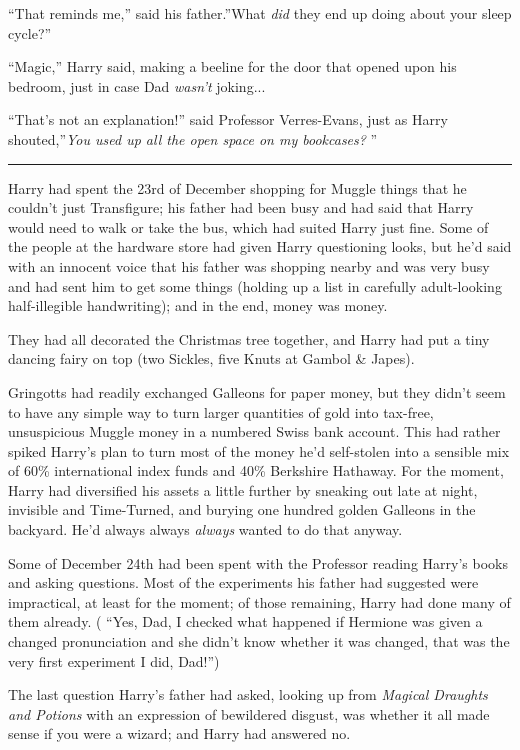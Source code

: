 ``That reminds me,'' said his father.''What \emph{did} they end up doing
about your sleep cycle?''

``Magic,'' Harry said, making a beeline for the door that opened upon
his bedroom, just in case Dad \emph{wasn't} joking...

``That's not an explanation!'' said Professor Verres-Evans, just as
Harry shouted,''\emph{You used up all the open space on my bookcases?} ''

\begin{center}\rule{3in}{0.4pt}\end{center}

Harry had spent the 23rd of December shopping for Muggle things that he
couldn't just Transfigure; his father had been busy and had said that
Harry would need to walk or take the bus, which had suited Harry just
fine. Some of the people at the hardware store had given Harry
questioning looks, but he'd said with an innocent voice that his father
was shopping nearby and was very busy and had sent him to get some
things (holding up a list in carefully adult-looking half-illegible
handwriting); and in the end, money was money.

They had all decorated the Christmas tree together, and Harry had put a
tiny dancing fairy on top (two Sickles, five Knuts at Gambol \& Japes).

Gringotts had readily exchanged Galleons for paper money, but they
didn't seem to have any simple way to turn larger quantities of gold
into tax-free, unsuspicious Muggle money in a numbered Swiss bank
account. This had rather spiked Harry's plan to turn most of the money
he'd self-stolen into a sensible mix of 60\% international index funds
and 40\% Berkshire Hathaway. For the moment, Harry had diversified his
assets a little further by sneaking out late at night, invisible and
Time-Turned, and burying one hundred golden Galleons in the backyard.
He'd always always \emph{always} wanted to do that anyway.

Some of December 24th had been spent with the Professor reading Harry's
books and asking questions. Most of the experiments his father had
suggested were impractical, at least for the moment; of those remaining,
Harry had done many of them already. ( ``Yes, Dad, I checked what
happened if Hermione was given a changed pronunciation and she didn't
know whether it was changed, that was the very first experiment I did,
Dad!'')

The last question Harry's father had asked, looking up from
\emph{Magical Draughts and Potions} with an expression of bewildered
disgust, was whether it all made sense if you were a wizard; and Harry
had answered no.

